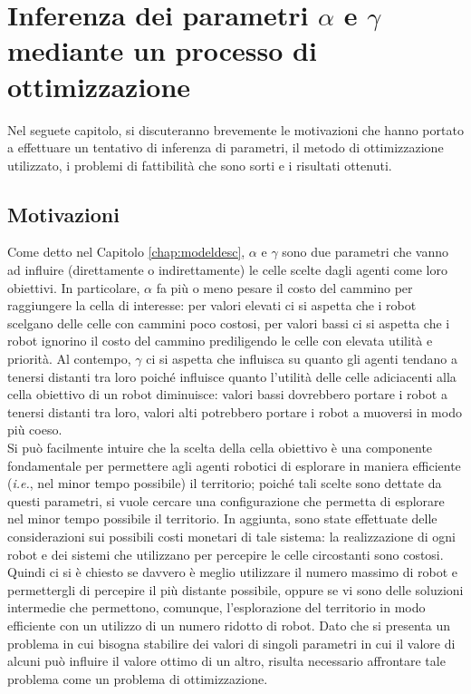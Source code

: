 \chapter{Inferenza dei parametri $\alpha$ e $\gamma$ mediante un processo di ottimizzazione}
\label{chap:pso}
Nel seguete capitolo, si discuteranno brevemente le motivazioni che hanno portato a effettuare un tentativo di inferenza di parametri, il metodo di ottimizzazione utilizzato, i problemi di fattibilità che sono sorti e i risultati ottenuti.

\section{Motivazioni}
Come detto nel Capitolo \ref{chap:modeldesc}, $\alpha$ e $\gamma$ sono due parametri che vanno ad influire (direttamente o indirettamente) le celle scelte dagli agenti come loro obiettivi.
In particolare, $\alpha$ fa più o meno pesare il costo del cammino per raggiungere la cella di interesse: per valori elevati ci si aspetta che i robot scelgano delle celle con cammini poco costosi, per valori bassi ci si aspetta che i robot ignorino il costo del cammino prediligendo le celle con elevata utilità e priorità.
Al contempo, $\gamma$ ci si aspetta che influisca su quanto gli agenti tendano a tenersi distanti tra loro poiché influisce quanto l'utilità delle celle adiciacenti alla cella obiettivo di un robot diminuisce: valori bassi dovrebbero portare i robot a tenersi distanti tra loro, valori alti potrebbero portare i robot a muoversi in modo più coeso.\\
Si può facilmente intuire che la scelta della cella obiettivo è una componente fondamentale per permettere agli agenti robotici di esplorare in maniera efficiente (\textit{i.e.}, nel minor tempo possibile) il territorio; poiché tali scelte sono dettate da questi parametri, si vuole cercare una configurazione che permetta di esplorare nel minor tempo possibile il territorio.
In aggiunta, sono state effettuate delle considerazioni sui possibili costi monetari di tale sistema: la realizzazione di ogni robot e dei sistemi che utilizzano per percepire le celle circostanti sono costosi.
Quindi ci si è chiesto se davvero è meglio utilizzare il numero massimo di robot e permettergli di percepire il più distante possibile, oppure se vi sono delle soluzioni intermedie che permettono, comunque, l'esplorazione del territorio in modo efficiente con un utilizzo di un numero ridotto di robot.
Dato che si presenta un problema in cui bisogna stabilire dei valori di singoli parametri in cui il valore di alcuni può influire il valore ottimo di un altro, risulta necessario affrontare tale problema come un problema di ottimizzazione.
